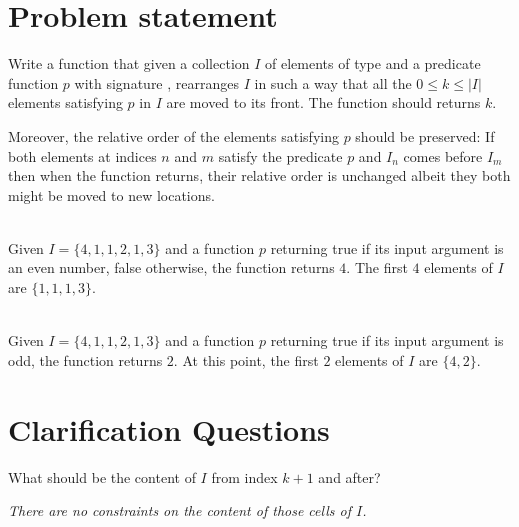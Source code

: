\section{Problem statement}
\begin{exercise}
\label{example:remove_all_occurrences_unsorted_array_inplace:exercice1}
Write a function that given a collection $I$ of elements of type 
 and a predicate function
 $p$ with signature , rearranges $I$ in such a way that all the $0 \leq k
 \leq |I|$ elements satisfying $p$ in $I$ are moved to its front. The function should returns $k$.

 Moreover, the relative order of the elements  satisfying $p$ should be preserved: If both elements
 at indices $n$ and $m$ satisfy the predicate $p$  and $I_n$ comes before $I_m$ then when the
 function returns, their relative order is unchanged albeit they both might be moved to new
 locations.
 
	\begin{example}
		\label{example:remove_all_occurrences_unsorted_array_inplace:example1}
		\hfill \\
		Given $I = \{{4, 1, 1, 2, 1, 3\}}$ and a function $p$ returning true if its input argument is an even number, false otherwise, the function returns $4$. The first $4$ elements of $I$ are $\{1,1,1,3\}$. 
		
	\end{example}

	\begin{example}
		\label{example:remove_all_occurrences_unsorted_array_inplace:example2}
		\hfill \\
		Given $I = \{4, 1, 1, 2, 1, 3\}$ and a function $p$ returning true if its input argument is odd, the function returns $2$. At this point, the first $2$ elements of $I$ are $\{4,2\}$. 
		
	\end{example}
\end{exercise}

\section{Clarification Questions}

\begin{QandA}
	\item What should be the content of $I$ from index $k+1$ and after?
	\begin{answered}
		\textit{There are no constraints on the content of those cells of $I$.}
	\end{answered}
	
\end{QandA}

